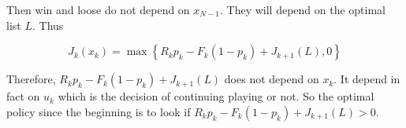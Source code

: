 \documentclass[11pt, english]{article}
\begin{document}
Then win and loose do not depend on $x_{N-1}$. They will depend on the optimal list $L$. Thus

\begin{equation*}
J_{k}(x_k) = \max\left\{R_{k} p_{k} - F_{k} (1 - p_{k}) + J_{k+1} (L), 0 \right\}
\end{equation*}

Therefore, $R_{k} p_{k} - F_{k} (1 - p_{k}) + J_{k+1} (L)$ does not depend on $x_k$. It depend in fact on $u_k$ which is the decision of continuing playing or not. So the optimal policy since the beginning is to look if $R_{k} p_{k} - F_{k} (1 - p_{k}) + J_{k+1} (L) > 0$.
\end{document}
